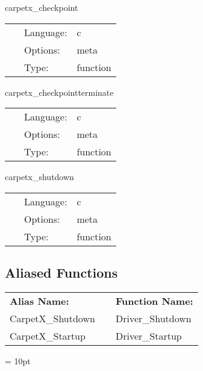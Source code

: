 \hspace{5mm} carpetx\_checkpoint 

\hspace{5mm}{\it checkpoint } 


\hspace{5mm}

 \begin{tabular*}{160mm}{cll} 
~ & Language:  & c \\ 
~ & Options:  & meta \\ 
~ & Type:  & function \\ 
\end{tabular*} 


\vspace{5mm}


\hspace{5mm} carpetx\_checkpointterminate 

\hspace{5mm}{\it checkpoint before terminating } 


\hspace{5mm}

 \begin{tabular*}{160mm}{cll} 
~ & Language:  & c \\ 
~ & Options:  & meta \\ 
~ & Type:  & function \\ 
\end{tabular*} 


\vspace{5mm}


\hspace{5mm} carpetx\_shutdown 

\hspace{5mm}{\it shut down the driver } 


\hspace{5mm}

 \begin{tabular*}{160mm}{cll} 
~ & Language:  & c \\ 
~ & Options:  & meta \\ 
~ & Type:  & function \\ 
\end{tabular*} 


\subsection*{Aliased Functions}

\hspace{5mm}

 \begin{tabular*}{160mm}{ll} 

{\bf Alias Name:} ~~~~~~~ & {\bf Function Name:} \\ 
CarpetX\_Shutdown & Driver\_Shutdown \\ 
CarpetX\_Startup & Driver\_Startup \\ 
\end{tabular*} 



\vspace{5mm}\parskip = 10pt 

